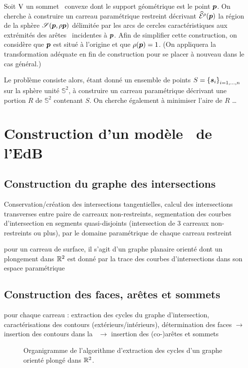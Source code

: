 Soit $\mathrm{V}$ un sommet \brep\ convexe dont le support géométrique est le point $\boldsymbol{p}$. 
On cherche à construire un carreau paramétrique restreint décrivant $\widehat{\mathcal{E}}^{\rho}({\boldsymbol{p}})$ \ie la région de la sphère $\sphere[\p][\rho{\p}]$ délimitée par les arcs de cercles caractéristiques aux extrémités des arêtes \brep\ incidentes à $\boldsymbol{p}$. 
Afin de simplifier cette construction, on considère que $\boldsymbol{p}$ est situé à l'origine et que $\rho(\boldsymbol{p}) = 1$. 
(On appliquera la transformation adéquate en fin de construction pour se placer à nouveau dans le cas général.)
\par
Le problème consiste alors, étant donné un ensemble de points $S = \left\{{\boldsymbol{s}}_{i}\right\}_{{i}={1},\ldots,{n}}$ sur la sphère unité $\mathbb{S}^2$, à construire un carreau paramétrique décrivant une portion $R$ de $\mathbb{S}^2$ contenant $S$. 
On cherche également à minimiser l'aire de $R$ \ldots




\section{Construction d'un modèle \brep\ de l'EdB}

\subsection{Construction du graphe des intersections}
Conservation/création des intersections tangentielles, calcul des intersections transverses entre paire de carreaux non-restreints, segmentation des courbes d'intersection en segments quasi-disjoints (intersection de 3 carreaux non-restreints ou plus),  par le domaine paramétrique de chaque carreau restreint
\par\bigskip
pour un carreau de surface, il s'agit d'un graphe planaire orienté dont un plongement dans $\mathbb{R}^2$ est donné par la trace des courbes d'intersections dans son espace paramétrique



\subsection{Construction des faces, arêtes et sommets \brep}
pour chaque carreau : extraction des cycles du graphe d'intersection, caractérisations des contours (extérieurs/intérieurs), détermination des faces $\to$ insertion des contours dans la \brep\ $\to$ insertion des (co-)arêtes et sommets
\begin{figure}
	\centering
	
	\caption{Organigramme de l'algorithme d'extraction des cycles d'un graphe orienté plongé dans $\mathbb{R}^2$.}
\end{figure}


%	
